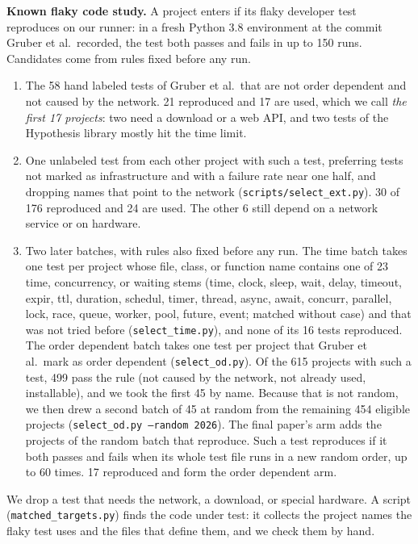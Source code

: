\textbf{Known flaky code study.} A project enters if its flaky developer test reproduces on our runner: in a fresh Python 3.8 environment at the commit Gruber et al.\ recorded, the test both passes and fails in up to 150 runs. Candidates come from rules fixed before any run.
\begin{enumerate}
\item The 58 hand labeled tests of Gruber et al.\ that are not order dependent and not caused by the network. 21 reproduced and 17 are used, which we call \emph{the first 17 projects}: two need a download or a web API, and two tests of the Hypothesis library mostly hit the time limit.
\item One unlabeled test from each other project with such a test, preferring tests not marked as infrastructure and with a failure rate near one half, and dropping names that point to the network (\texttt{scripts/select\_ext.py}). 30 of 176 reproduced and 24 are used. The other 6 still depend on a network service or on hardware.
\item Two later batches, with rules also fixed before any run. The time batch takes one test per project whose file, class, or function name contains one of 23 time, concurrency, or waiting stems (time, clock, sleep, wait, delay, timeout, expir, ttl, duration, schedul, timer, thread, async, await, concurr, parallel, lock, race, queue, worker, pool, future, event; matched without case) and that was not tried before (\texttt{select\_time.py}), and none of its 16 tests reproduced. The order dependent batch takes one test per project that Gruber et al.\ mark as order dependent (\texttt{select\_od.py}). Of the 615 projects with such a test, 499 pass the rule (not caused by the network, not already used, installable), and we took the first 45 by name. Because that is not random, we then drew a second batch of 45 at random from the remaining 454 eligible projects (\texttt{select\_od.py --random 2026}). The final paper's arm adds the projects of the random batch that reproduce. Such a test reproduces if it both passes and fails when its whole test file runs in a new random order, up to 60 times. 17 reproduced and form the order dependent arm.
\end{enumerate}
We drop a test that needs the network, a download, or special hardware. A script (\texttt{matched\_targets.py}) finds the code under test: it collects the project names the flaky test uses and the files that define them, and we check them by hand.

